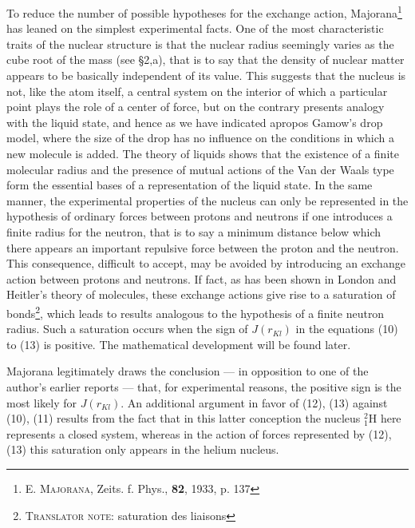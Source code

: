 \documentclass[a4paper,11pt]{article}
\newcommand{\?}[2]{#1\footnote{\textsc{Translator note}: #2}}
\newcommand{\citeauthor}[1]{\textsc{#1}}
\newcommand{\citepub}[1]{#1}
\newcommand{\citevol}[1]{\textbf{#1}}
\newcommand{\citepage}[1]{#1}
\newcommand{\citeyear}[1]{#1}
\newcommand{\El}[1]{\text{#1}}
\newcommand{\mnEl}[3]{{}^{#1}_{#2}{\El{#3}}}
\begin{document}
{{To reduce the number of possible hypotheses for the exchange action, Majorana\footnote{\citeauthor{E. Majorana}, \citepub{Zeits. f. Phys.}, \citevol{82}, \citeyear{1933}, \citepage{p. 137}} has leaned on the simplest experimental facts. One of the most characteristic traits of the nuclear structure is that the nuclear radius seemingly varies as the cube root of the mass (see \S2,a), that is to say that the density of nuclear matter appears to be basically independent of its value. This suggests that the nucleus is not, like the atom itself, a central system on the interior of which a particular point plays the role of a center of force, but on the contrary presents analogy with the liquid state, and hence as we have indicated apropos Gamow's drop model, where the size of the drop has no influence on the conditions in which a new molecule is added. The theory of liquids shows that the existence of a finite molecular radius and the presence of mutual actions of the Van der Waals type form the essential bases of a representation of the liquid state. In the same manner, the experimental properties of the nucleus can only be represented in the hypothesis of ordinary forces between protons and neutrons if one introduces a finite radius for the neutron, that is to say a minimum distance below which there appears an important repulsive force between the proton and the neutron. This consequence, difficult to accept, may be avoided by introducing an exchange action between protons and neutrons. If fact, as has been shown in London and Heitler's theory of molecules, these exchange actions give rise to a \?{saturation of bonds}{saturation des liaisons}, which leads to results analogous to the hypothesis of a finite neutron radius. Such a saturation occurs when the sign of $J(r_{Kl})$ in the equations (10) to (13) is positive. The mathematical development will be found later.

Majorana legitimately draws the conclusion — in opposition to one of the author's earlier reports — that, for experimental reasons, the positive sign is the most likely for $J(r_{Kl})$. An additional argument in favor of (12), (13) against (10), (11) results from the fact that in this latter conception the nucleus $\mnEl{2}{1}{H}$ here represents a closed system, whereas in the action of forces represented by (12), (13) this saturation only appears in the helium nucleus.

}}
\end{document}

